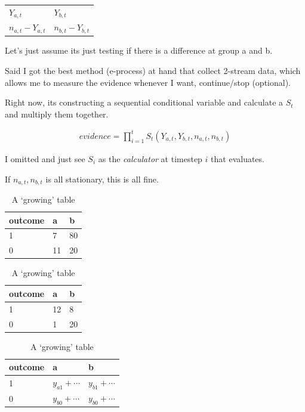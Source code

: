 \begin{tabular}{ll}
	\toprule
	$Y_{a,t}$          & $Y_{b,t}$          \\
	$n_{a,t}- Y_{a,t}$ & $n_{b,t}- Y_{b,t}$ \\
	\bottomrule
\end{tabular}

Let's just assume its just testing if there is a difference at group a and b.

Said I got the best method (e-process) at hand that collect 2-stream data, which allows me to measure the evidence whenever I want, continue/stop (optional).

Right now, its constructing a sequential conditional variable and calculate a $S_t$ and multiply them together.

\begin{align*}
	evidence = \prod_{i=1}^t S_t(Y_{a,t},Y_{b,t},n_{a,t},n_{b,t})
\end{align*}

I omitted and just see $S_i$ as the \emph{calculator} at timestep $i$ that evaluates.

If $n_{a,t},n_{b,t}$ is all stationary, this is all fine.

\begin{table}[h]
	\centering
	\begin{minipage}{0.3\textwidth}
		\centering
		\begin{tabular}{lll}
			\toprule
			outcome & a  & b  \\
			\midrule
			1       & 7  & 80 \\
			0       & 11 & 20 \\
			\bottomrule
		\end{tabular}
		\caption{A table between 50 and 51}
	\end{minipage}
	\hfill
	\begin{minipage}{0.3\textwidth}
		\centering
		\begin{tabular}{lll}
			\toprule
			outcome & a  & b  \\
			\midrule
			1       & 12 & 8  \\
			0       & 1  & 20 \\
			\bottomrule
		\end{tabular}
		\caption{A table between 100 and 101}
	\end{minipage}
	\hfill
	\begin{minipage}{0.3\textwidth}
		\centering
		\begin{tabular}{lll}
			\toprule
			outcome & a               & b               \\
			\midrule
			1       & $y_{a1}+\cdots$ & $y_{b1}+\cdots$ \\
			0       & $y_{b0}+\cdots$ & $y_{b0}+\cdots$ \\
			\bottomrule
		\end{tabular}
		\caption{A `growing' table}
	\end{minipage}
\end{table}

